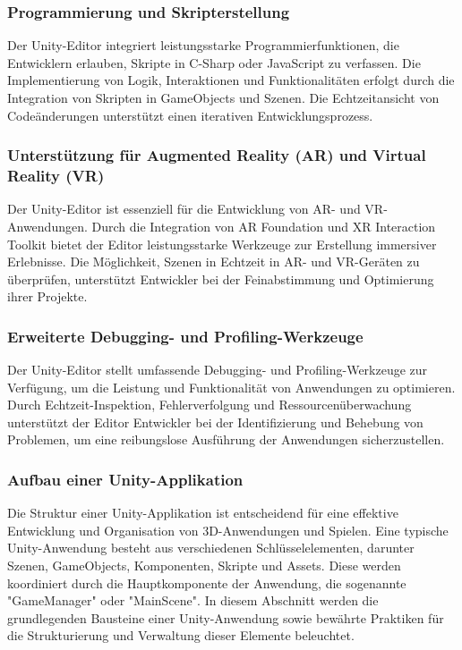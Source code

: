 \subsubsection{Programmierung und Skripterstellung}
Der Unity-Editor integriert leistungsstarke Programmierfunktionen, die Entwicklern erlauben, Skripte in C-Sharp oder
JavaScript zu verfassen. Die Implementierung von Logik, Interaktionen und Funktionalitäten erfolgt durch die
Integration von Skripten in GameObjects und Szenen. Die Echtzeitansicht von Codeänderungen unterstützt einen
iterativen Entwicklungsprozess.

\subsubsection{Unterstützung für Augmented Reality (AR) und Virtual Reality (VR)}
Der Unity-Editor ist essenziell für die Entwicklung von AR- und VR-Anwendungen. Durch die Integration von AR Foundation
und XR Interaction Toolkit bietet der Editor leistungsstarke Werkzeuge zur Erstellung immersiver Erlebnisse. Die
Möglichkeit, Szenen in Echtzeit in AR- und VR-Geräten zu überprüfen, unterstützt Entwickler bei der Feinabstimmung
und Optimierung ihrer Projekte.

\subsubsection{Erweiterte Debugging- und Profiling-Werkzeuge}
Der Unity-Editor stellt umfassende Debugging- und Profiling-Werkzeuge zur Verfügung, um die Leistung und Funktionalität
von Anwendungen zu optimieren. Durch Echtzeit-Inspektion, Fehlerverfolgung und Ressourcenüberwachung unterstützt der
Editor Entwickler bei der Identifizierung und Behebung von Problemen, um eine reibungslose Ausführung der Anwendungen
sicherzustellen.

\subsubsection{Aufbau einer Unity-Applikation}
Die Struktur einer Unity-Applikation ist entscheidend für eine effektive Entwicklung und Organisation von 3D-Anwendungen
und Spielen. Eine typische Unity-Anwendung besteht aus verschiedenen Schlüsselelementen, darunter Szenen, GameObjects,
Komponenten, Skripte und Assets. Diese werden koordiniert durch die Hauptkomponente der Anwendung, die sogenannte
"GameManager" oder "MainScene". In diesem Abschnitt werden die grundlegenden Bausteine einer Unity-Anwendung sowie
bewährte Praktiken für die Strukturierung und Verwaltung dieser Elemente beleuchtet.

